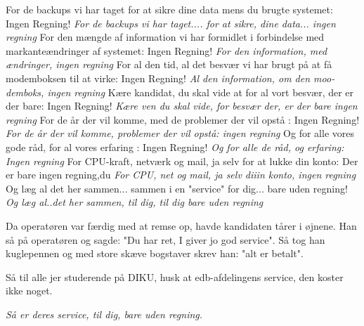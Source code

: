 \documentclass[danish]{article}
\begin{document}
\begin{song}
 For de backups vi har taget for at sikre dine data mens du brugte systemet: Ingen Regning!
\emph{For de backups vi har taget.... for at sikre, dine data... ingen regning}
For den mængde af information vi har formidlet i forbindelse med markanteændringer af systemet:   %
  Ingen Regning!
\emph{For den information, med ændringer,  ingen regning}
For al den tid, al det besvær vi har brugt på at få modemboksen til at virke: Ingen Regning!
\emph{Al den information, om den moo-demboks, ingen regning}
Kære kandidat, du skal vide at for al vort besvær, der er der bare: Ingen Regning!
\emph{Kære ven du skal vide, for besvær der, er der bare ingen regning}
For de år der vil komme, med de problemer der vil opstå : Ingen Regning!
\emph{For de år der vil komme, problemer der vil opstå: ingen regning}
Og for alle vores gode råd, for al vores erfaring : Ingen Regning!
\emph{Og for alle de råd, og erfaring: Ingen regning}
For CPU-kraft, netværk og mail, ja selv for at lukke din konto:   Der er bare ingen regning,du
\emph{For CPU, net og mail, ja selv diiin konto, ingen regning}
Og læg al det her sammen... sammen i en "service" for dig... bare uden regning!
\emph{Og læg al..det her sammen, til dig, til dig bare uden regning}


 Da operatøren var færdig med at remse op, 
havde kandidaten tårer i øjnene. 
Han så på operatøren og sagde: "Du har ret, I giver jo god service".
Så tog han kuglepennen 
og med store skæve bogstaver skrev han: "alt er betalt".

 Så til alle jer studerende på DIKU, husk at edb-afdelingens service, den koster ikke noget.

\emph{Så er deres service, til dig, bare uden regning.}
\end{song}
\end{document}
